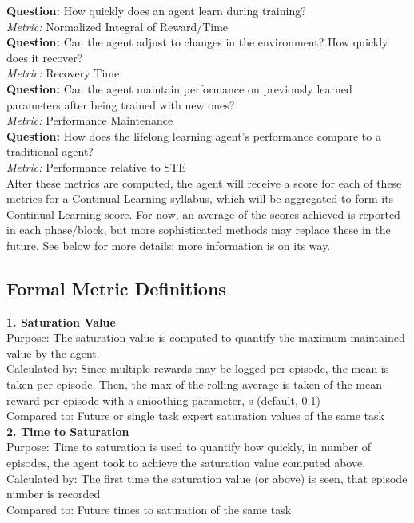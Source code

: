 \textbf{Question:} How quickly does an agent learn during training?\\
\textit{Metric:} Normalized Integral of Reward/Time\\[0.1in]


\textbf{Question:} Can the agent adjust to changes in the environment? How quickly does it recover?\\
\textit{Metric:} Recovery Time\\[0.1in]


\textbf{Question:} Can the agent maintain performance on previously learned parameters after being trained with new ones?\\
\textit{Metric:} Performance Maintenance\\[0.1in]


\textbf{Question:} How does the lifelong learning agent's performance compare to a traditional agent?\\
\textit{Metric:} Performance relative to STE \\[0.2in]
            
            

After these metrics are computed, the agent will receive a score for  each of these metrics for a Continual Learning syllabus, which will be aggregated to form its Continual Learning score. For now, an average of the scores achieved is reported in each phase/block, but more sophisticated methods may replace these in the future. See below for more details; more information is on its way.
    


\subsection*{Formal Metric Definitions}

\textbf{1. Saturation Value}\\
Purpose: The saturation value is computed to quantify the maximum maintained value by the agent.\\
Calculated by: Since multiple rewards may be logged per episode, the mean is taken per episode. Then, the max of the rolling average is taken of the mean reward per episode with a smoothing parameter, s (default, 0.1)\\
Compared to: Future or single task expert saturation values of the same task\\[0.1in]         


\textbf{2. Time to Saturation}\\
Purpose: Time to saturation is used to quantify how quickly, in number of episodes, the agent took to achieve the saturation value computed above.\\
Calculated by: The first time the saturation value (or above) is seen, that episode number is recorded\\
Compared to: Future times to saturation of the same task\\[0.1in]


